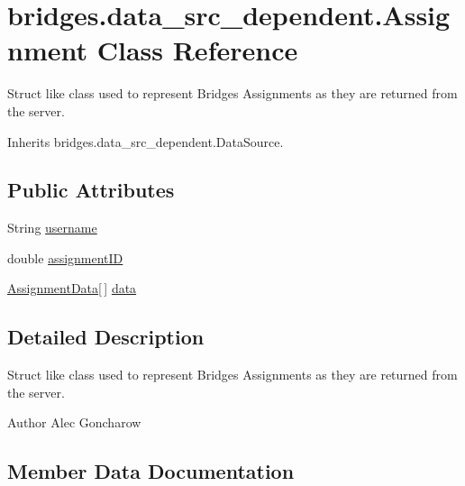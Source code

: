 \hypertarget{classbridges_1_1data__src__dependent_1_1_assignment}{}\section{bridges.\+data\+\_\+src\+\_\+dependent.\+Assignment Class Reference}
\label{classbridges_1_1data__src__dependent_1_1_assignment}


Struct like class used to represent Bridges Assignments as they are returned from the server.  




Inherits bridges.\+data\+\_\+src\+\_\+dependent.\+Data\+Source.

\subsection*{Public Attributes}
\begin{DoxyCompactItemize}
\item 
String \hyperlink{classbridges_1_1data__src__dependent_1_1_assignment_aa7326ba8e0eb02fff4e5b22e4b89e61d}{username}
\item 
double \hyperlink{classbridges_1_1data__src__dependent_1_1_assignment_a88c98da9e5ba6f8d83326d6fbae659d8}{assignment\+I\+D}
\item 
\hyperlink{classbridges_1_1data__src__dependent_1_1_assignment_data}{Assignment\+Data}\mbox{[}$\,$\mbox{]} \hyperlink{classbridges_1_1data__src__dependent_1_1_assignment_a23d503c5e6eae939bb8262dc8e18c259}{data}
\end{DoxyCompactItemize}


\subsection{Detailed Description}
Struct like class used to represent Bridges Assignments as they are returned from the server. 

\begin{DoxyAuthor}{Author}
Alec Goncharow 
\end{DoxyAuthor}


\subsection{Member Data Documentation}
\hypertarget{classbridges_1_1data__src__dependent_1_1_assignment_a88c98da9e5ba6f8d83326d6fbae659d8}{}
